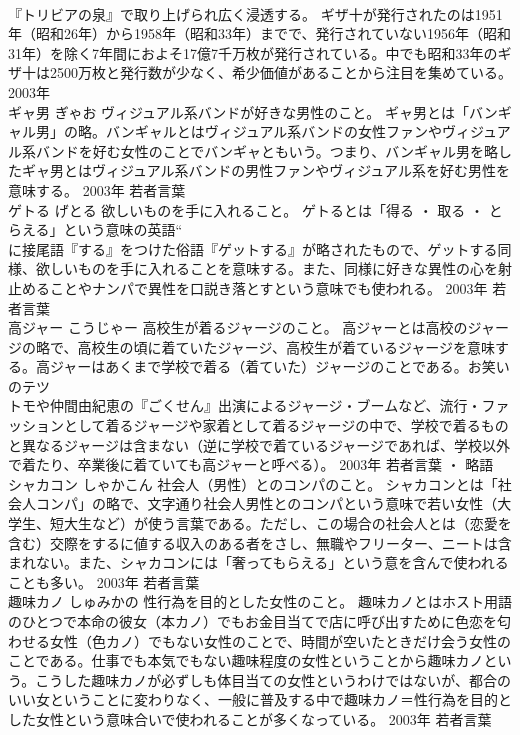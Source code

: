 \documentclass[8pt]{extreport}
\begin{document}
\begin{CJK}{UTF8}{min}
\\	『トリビアの泉』で取り上げられ広く浸透する。 ギザ十が発行されたのは1951年（昭和26年）から1958年（昭和33年）までで、発行されていない1956年（昭和31年）を除く7年間におよそ17億7千万枚が発行されている。中でも昭和33年のギザ十は2500万枚と発行数が少なく、希少価値があることから注目を集めている。	2003年	
\\	ギャ男	ぎゃお	ヴィジュアル系バンドが好きな男性のこと。	ギャ男とは「バンギャル男」の略。バンギャルとはヴィジュアル系バンドの女性ファンやヴィジュアル系バンドを好む女性のことでバンギャともいう。つまり、バンギャル男を略したギャ男とはヴィジュアル系バンドの男性ファンやヴィジュアル系を好む男性を意味する。	2003年	若者言葉	
\\	ゲトる	げとる	欲しいものを手に入れること。	ゲトるとは「得る ・ 取る ・ とらえる」という意味の英語“
\\	に接尾語『する』をつけた俗語『ゲットする』が略されたもので、ゲットする同様、欲しいものを手に入れることを意味する。また、同様に好きな異性の心を射止めることやナンパで異性を口説き落とすという意味でも使われる。	2003年	若者言葉	
\\	高ジャー	こうじゃー	高校生が着るジャージのこと。	高ジャーとは高校のジャージの略で、高校生の頃に着ていたジャージ、高校生が着ているジャージを意味する。高ジャーはあくまで学校で着る（着ていた）ジャージのことである。お笑いのテツ
\\	トモや仲間由紀恵の『ごくせん』出演によるジャージ・ブームなど、流行・ファッションとして着るジャージや家着として着るジャージの中で、学校で着るものと異なるジャージは含まない（逆に学校で着ているジャージであれば、学校以外で着たり、卒業後に着ていても高ジャーと呼べる）。	2003年	若者言葉 ・ 略語	
\\	シャカコン	しゃかこん	社会人（男性）とのコンパのこと。	シャカコンとは「社会人コンパ」の略で、文字通り社会人男性とのコンパという意味で若い女性（大学生、短大生など）が使う言葉である。ただし、この場合の社会人とは（恋愛を含む）交際をするに値する収入のある者をさし、無職やフリーター、ニートは含まれない。また、シャカコンには「奢ってもらえる」という意を含んで使われることも多い。	2003年	若者言葉	
\\	趣味カノ	しゅみかの	性行為を目的とした女性のこと。	趣味カノとはホスト用語のひとつで本命の彼女（本カノ）でもお金目当てで店に呼び出すために色恋を匂わせる女性（色カノ）でもない女性のことで、時間が空いたときだけ会う女性のことである。仕事でも本気でもない趣味程度の女性ということから趣味カノという。こうした趣味カノが必ずしも体目当ての女性というわけではないが、都合のいい女ということに変わりなく、一般に普及する中で趣味カノ＝性行為を目的とした女性という意味合いで使われることが多くなっている。	2003年	若者言葉	

\end{CJK}
\end{document}
